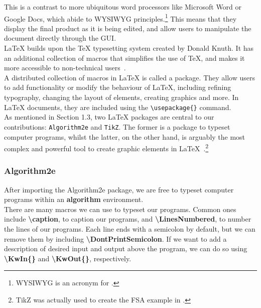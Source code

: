 This is a contrast to more ubiquitous word processors like Microsoft Word or Google Docs, which abide to WYSIWYG principles.\footnote{WYSIWYG is an acronym for .} This means that they display the final product as it is being edited, and allow users to manipulate the document directly through the GUI. \\

LaTeX builds upon the TeX typesetting system created by Donald Knuth. It has an additional collection of macros that simplifies the use of TeX, and makes it more accessible to non-technical users~\cite[7]{latex}. \\

A distributed collection of macros in LaTeX is called a package. They allow users to add functionality or modify the behaviour of LaTeX, including refining typography, changing the layout of elements, creating graphics and more. In LaTeX documents, they are included using the \texttt{\textbackslash usepackage\{\}} command. \\

As mentioned in Section 1.3, two LaTeX packages are central to  our contributions: \texttt{Algorithm2e} and \texttt{TikZ}. The former is a package to typeset computer programs, whilst the latter, on the other hand, is arguably the most complex and powerful tool to create graphic elements in LaTeX~\cite{algorithm2e, tikz}.\footnote{TikZ was actually used to create the FSA example in .}

\subsubsection{Algorithm2e}

After importing the Algorithm2e package, we are free to typeset computer programs within an \textbf{algorithm} environment. \\

There are many macros we can use to typeset our programs. Common ones include \textbf{\textbackslash caption}, to caption our programs, and \textbf{\textbackslash LinesNumbered}, to number the lines of our programs. Each line ends with a semicolon by default, but we can remove them by including \textbf{\textbackslash DontPrintSemicolon}. If we want to add a description of desired input and output above the program, we can do so using \textbf{\textbackslash KwIn\{\}} and \textbf{\textbackslash KwOut\{\}}, respectively. \\

